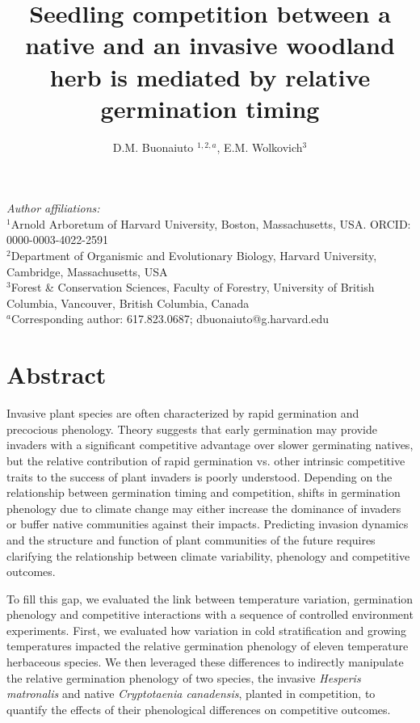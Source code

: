 \documentclass{article}[11pt]
\title{Seedling competition between a native %
and an invasive %
woodland herb is mediated by relative germination timing}
\author{D.M. Buonaiuto $^{1,2,a}$, E.M. Wolkovich$^{3}$}
\date{}
\begin{document}

\maketitle

\noindent \emph{Author affiliations:}\\
\noindent $^1$Arnold Arboretum of Harvard University, Boston, Massachusetts, USA. ORCID: 0000-0003-4022-2591\\
$^2$Department of Organismic and Evolutionary Biology, Harvard University, Cambridge, Massachusetts, USA \\
$^3$Forest \& Conservation Sciences, Faculty of Forestry, University of British Columbia, Vancouver, British Columbia, Canada\\
$^a$Corresponding author: 617.823.0687; dbuonaiuto@g.harvard.edu\\
\pagebreak
\section*{Abstract}
Invasive plant species are often characterized by rapid germination and precocious phenology. Theory suggests that early germination may provide invaders with a significant competitive advantage over slower germinating natives, but the relative contribution of rapid germination vs. other intrinsic competitive traits to the success of plant invaders is poorly understood. Depending on the relationship between germination timing and competition, shifts in germination phenology due to climate change may either increase the dominance of invaders or buffer native communities against their impacts. Predicting invasion dynamics and the structure and function of plant communities of the future requires clarifying the relationship between climate variability, phenology and competitive outcomes.

To fill this gap, we evaluated the link between temperature variation, germination phenology and competitive interactions with a sequence of controlled environment experiments. First, we evaluated how variation in cold stratification and growing temperatures impacted the relative germination phenology of eleven temperature herbaceous species. We then leveraged these differences to indirectly manipulate the relative germination phenology of two species, the invasive \textit{Hesperis matronalis} and native \textit{Cryptotaenia canadensis}, planted in competition, to quantify the effects of their phenological differences on competitive outcomes.
\end{document}
